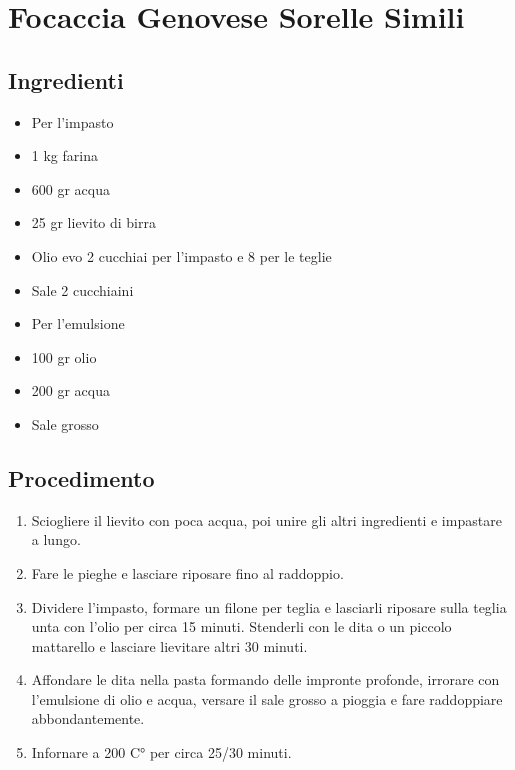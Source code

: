 \section{Focaccia Genovese Sorelle Simili}
\subsection{Ingredienti}
\begin{itemize}
\item Per l'impasto  
\item 1 kg farina  
\item 600 gr acqua  
\item 25 gr lievito di birra  
\item Olio evo 2 cucchiai per l'impasto e 8 per le teglie  
\item Sale 2 cucchiaini   
\item Per l'emulsione  
\item 100 gr olio   
\item 200 gr acqua  
\item Sale grosso
\end{itemize}
\subsection{Procedimento}
\begin{enumerate}
\item  Sciogliere il lievito con poca acqua, poi unire gli altri ingredienti e impastare a lungo.  
\item  Fare le pieghe e lasciare riposare fino al raddoppio.  
\item  Dividere l'impasto, formare un filone per teglia e lasciarli riposare sulla teglia unta con l'olio per circa 15 minuti. Stenderli con le dita o un piccolo mattarello e lasciare lievitare altri 30 minuti.  
\item  Affondare le dita nella pasta formando delle impronte profonde, irrorare con l'emulsione di olio e acqua, versare il sale grosso a pioggia e fare raddoppiare abbondantemente.  
\item  Infornare a 200 C° per circa 25/30 minuti. 
\end{enumerate}
